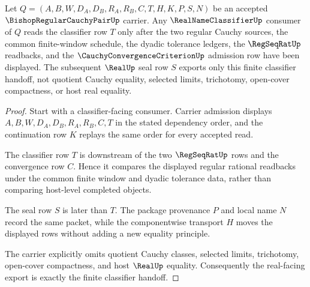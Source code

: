 \begin{theorem}
\label{thm:bishopregularcauchypair-real-classifier-handoff}
Let $Q=(A,B,W,D_A,D_B,R_A,R_B,C,T,H,K,P,S,N)$ be an accepted $\BishopRegularCauchyPairUp$ carrier. Any $\RealNameClassifierUp$ consumer of $Q$ reads the classifier row $T$ only after the two regular Cauchy sources, the common finite-window schedule, the dyadic tolerance ledgers, the $\RegSeqRatUp$ readbacks, and the $\CauchyConvergenceCriterionUp$ admission row have been displayed. The subsequent $\RealUp$ seal row $S$ exports only this finite classifier handoff, not quotient Cauchy equality, selected limits, trichotomy, open-cover compactness, or host real equality.
\end{theorem}
\begin{proof}
Start with a classifier-facing consumer. Carrier admission displays $A,B,W,D_A,D_B,R_A,R_B,C,T$ in the stated dependency order, and the continuation row $K$ replays the same order for every accepted read.

The classifier row $T$ is downstream of the two $\RegSeqRatUp$ rows and the convergence row $C$. Hence it compares the displayed regular rational readbacks under the common finite window and dyadic tolerance data, rather than comparing host-level completed objects.

The seal row $S$ is later than $T$. The package provenance $P$ and local name $N$ record the same packet, while the componentwise transport $H$ moves the displayed rows without adding a new equality principle.

The carrier explicitly omits quotient Cauchy classes, selected limits, trichotomy, open-cover compactness, and host $\RealUp$ equality. Consequently the real-facing export is exactly the finite classifier handoff.
\end{proof}

